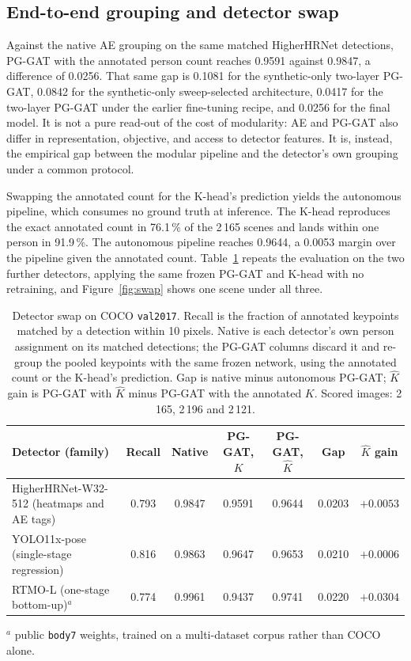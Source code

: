 \subsection{End-to-end grouping and detector swap}
\label{sec:results_e2e}

Against the native AE grouping on the same matched HigherHRNet detections,
PG-GAT with the annotated person count reaches 0.9591 against 0.9847, a difference of 0.0256.
That same gap is 0.1081 for the synthetic-only two-layer PG-GAT,
0.0842 for the synthetic-only sweep-selected architecture,
0.0417 for the two-layer PG-GAT under the earlier fine-tuning recipe, and 0.0256 for the final model.
It is not a pure read-out of the cost of modularity: AE and PG-GAT also differ in representation, objective, and access to detector features.
It is, instead, the empirical gap between the modular pipeline and the detector's own grouping under a common protocol.

Swapping the annotated count for the K-head's prediction yields the autonomous pipeline, which consumes no ground truth at inference.
The K-head reproduces the exact annotated count in 76.1\,\% of the 2\,165 scenes and lands within one person in 91.9\,\%.
The autonomous pipeline reaches 0.9644, a 0.0053 margin over the pipeline given the annotated count.
Table~\ref{tab:swap} repeats the evaluation on the two further detectors, applying the same frozen PG-GAT
and K-head with no retraining, and Figure~\ref{fig:swap} shows one scene under all three.

\begin{table}[!t]
\centering
\caption{Detector swap on COCO \texttt{val2017}.
Recall is the fraction of annotated keypoints matched by a detection within 10 pixels.
Native is each detector's own person assignment on its matched detections; the PG-GAT columns discard it
and re-group the pooled keypoints with the same frozen network,
using the annotated count or the K-head's prediction.
Gap is native minus autonomous PG-GAT; $\hat K$ gain is PG-GAT with $\hat K$ minus PG-GAT with the annotated $K$.
Scored images: 2\,165, 2\,196 and 2\,121.}
\label{tab:swap}
\footnotesize\setlength{\tabcolsep}{3.5pt}
\begin{tabular}{lcccccc}
\toprule
Detector (family) & Recall & Native & PG-GAT, $K$ & PG-GAT, $\hat K$ & Gap & $\hat K$ gain \\
\midrule
HigherHRNet-W32-512 (heatmaps and AE tags) & 0.793 & 0.9847 & 0.9591 & 0.9644 & 0.0203 & $+0.0053$ \\
YOLO11x-pose (single-stage regression) & 0.816 & 0.9863 & 0.9647 & 0.9653 & 0.0210 & $+0.0006$ \\
RTMO-L (one-stage bottom-up)$^{a}$ & 0.774 & 0.9961 & 0.9437 & 0.9741 & 0.0220 & $+0.0304$ \\
\bottomrule
\end{tabular}

\smallskip
\footnotesize $^{a}$ public \texttt{body7} weights, trained on a multi-dataset corpus rather than COCO alone.
\end{table}


